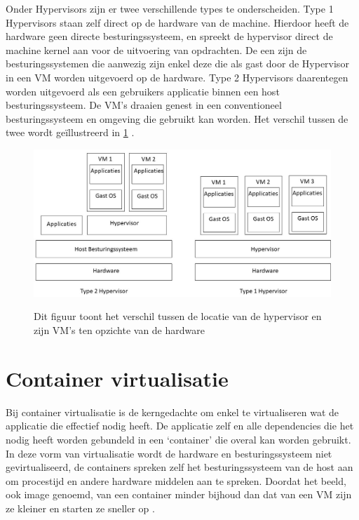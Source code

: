 Onder Hypervisors zijn er twee verschillende  types te onderscheiden. Type 1 Hypervisors staan zelf direct op de hardware van de machine. Hierdoor heeft de hardware geen directe besturingssysteem, en spreekt de hypervisor direct de machine kernel aan voor de uitvoering van opdrachten. De  een zijn de besturingssystemen die aanwezig zijn enkel deze die als gast door de Hypervisor in een VM worden uitgevoerd op de hardware. Type 2 Hypervisors daarentegen worden uitgevoerd als een gebruikers applicatie binnen een host besturingssysteem.  De VM’s draaien genest in een conventioneel besturingssysteem en omgeving die gebruikt kan worden. Het verschil tussen de twee wordt geïllustreerd in \ref{fig:hyperviors} \autocite{Yadav2018,Eder2016}.

\begin{figure}[h]
    \includegraphics[width=\linewidth]{img/hypervisors.jpg}
    \label{fig:hyperviors}
    \caption[Verschil tussen type 1 en type 2 hypervisor]{Dit figuur toont het verschil tussen de locatie van de hypervisor en zijn VM’s ten opzichte van de hardware }
    \centering
\end{figure}

\section{Container virtualisatie}

Bij container virtualisatie is de kerngedachte om enkel te virtualiseren wat de applicatie die effectief nodig heeft. De applicatie zelf en alle dependencies die het nodig heeft worden gebundeld in een ‘container’ die overal kan worden gebruikt. In deze vorm van virtualisatie wordt de hardware en besturingssysteem niet gevirtualiseerd, de containers spreken zelf het besturingssysteem van de host aan om procestijd en andere hardware middelen aan te spreken. Doordat het beeld, ook image genoemd, van een container minder bijhoud dan dat van een VM zijn ze kleiner en starten ze sneller op \autocite{Eder2016,jangla2018}.

